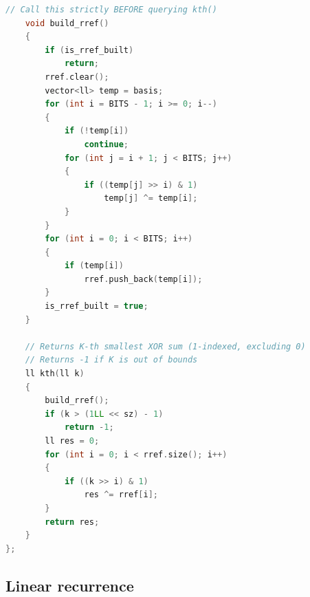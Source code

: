 \documentclass[10pt,landscape,a4paper,twocolumn]{article}
\begin{document}
\begin{lstlisting}[language=C++]
    // Call this strictly BEFORE querying kth()
    void build_rref()
    {
        if (is_rref_built)
            return;
        rref.clear();
        vector<ll> temp = basis;
        for (int i = BITS - 1; i >= 0; i--)
        {
            if (!temp[i])
                continue;
            for (int j = i + 1; j < BITS; j++)
            {
                if ((temp[j] >> i) & 1)
                    temp[j] ^= temp[i];
            }
        }
        for (int i = 0; i < BITS; i++)
        {
            if (temp[i])
                rref.push_back(temp[i]);
        }
        is_rref_built = true;
    }

    // Returns K-th smallest XOR sum (1-indexed, excluding 0)
    // Returns -1 if K is out of bounds
    ll kth(ll k)
    {
        build_rref();
        if (k > (1LL << sz) - 1)
            return -1;
        ll res = 0;
        for (int i = 0; i < rref.size(); i++)
        {
            if ((k >> i) & 1)
                res ^= rref[i];
        }
        return res;
    }
};
\end{lstlisting}
\subsection{Linear recurrence}
\end{document}

